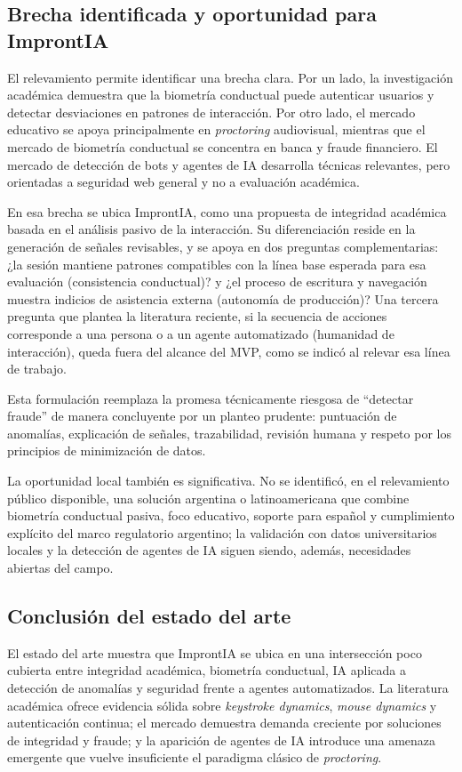 \subsection{Brecha identificada y oportunidad para ImprontIA}
El relevamiento permite identificar una brecha clara. Por un lado, la investigación académica demuestra que la biometría conductual puede autenticar usuarios y detectar desviaciones en patrones de interacción. Por otro lado, el mercado educativo se apoya principalmente en \textit{proctoring} audiovisual, mientras que el mercado de biometría conductual se concentra en banca y fraude financiero. El mercado de detección de bots y agentes de IA desarrolla técnicas relevantes, pero orientadas a seguridad web general y no a evaluación académica.

En esa brecha se ubica ImprontIA, como una propuesta de integridad académica basada en el análisis pasivo de la interacción. Su diferenciación reside en la generación de señales revisables, y se apoya en dos preguntas complementarias: ¿la sesión mantiene patrones compatibles con la línea base esperada para esa evaluación (consistencia conductual)? y ¿el proceso de escritura y navegación muestra indicios de asistencia externa (autonomía de producción)? Una tercera pregunta que plantea la literatura reciente, si la secuencia de acciones corresponde a una persona o a un agente automatizado (humanidad de interacción), queda fuera del alcance del MVP, como se indicó al relevar esa línea de trabajo.

Esta formulación reemplaza la promesa técnicamente riesgosa de ``detectar fraude'' de manera concluyente por un planteo prudente: puntuación de anomalías, explicación de señales, trazabilidad, revisión humana y respeto por los principios de minimización de datos.

La oportunidad local también es significativa. No se identificó, en el relevamiento público disponible, una solución argentina o latinoamericana que combine biometría conductual pasiva, foco educativo, soporte para español y cumplimiento explícito del marco regulatorio argentino; la validación con datos universitarios locales y la detección de agentes de IA siguen siendo, además, necesidades abiertas del campo.

\subsection{Conclusión del estado del arte}
El estado del arte muestra que ImprontIA se ubica en una intersección poco cubierta entre integridad académica, biometría conductual, IA aplicada a detección de anomalías y seguridad frente a agentes automatizados. La literatura académica ofrece evidencia sólida sobre \textit{keystroke dynamics}, \textit{mouse dynamics} y autenticación continua; el mercado demuestra demanda creciente por soluciones de integridad y fraude; y la aparición de agentes de IA introduce una amenaza emergente que vuelve insuficiente el paradigma clásico de \textit{proctoring}.

